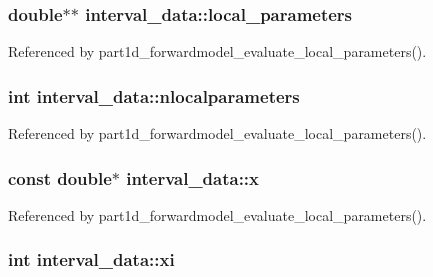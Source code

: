 \subsubsection[{\texorpdfstring{local\+\_\+parameters}{local_parameters}}]{\setlength{\rightskip}{0pt plus 5cm}double$\ast$$\ast$ interval\+\_\+data\+::local\+\_\+parameters}\hypertarget{structinterval__data_a1e7fbf7de483bc5799d45216be77801f}{}\label{structinterval__data_a1e7fbf7de483bc5799d45216be77801f}


Referenced by part1d\+\_\+forwardmodel\+\_\+evaluate\+\_\+local\+\_\+parameters().

\subsubsection[{\texorpdfstring{nlocalparameters}{nlocalparameters}}]{\setlength{\rightskip}{0pt plus 5cm}int interval\+\_\+data\+::nlocalparameters}\hypertarget{structinterval__data_ade5ceec3ebe5333bf2ace691bb44af27}{}\label{structinterval__data_ade5ceec3ebe5333bf2ace691bb44af27}


Referenced by part1d\+\_\+forwardmodel\+\_\+evaluate\+\_\+local\+\_\+parameters().

\subsubsection[{\texorpdfstring{x}{x}}]{\setlength{\rightskip}{0pt plus 5cm}const double$\ast$ interval\+\_\+data\+::x}\hypertarget{structinterval__data_a8ebc5c37f275985fd6f17bb3988ebe4c}{}\label{structinterval__data_a8ebc5c37f275985fd6f17bb3988ebe4c}


Referenced by part1d\+\_\+forwardmodel\+\_\+evaluate\+\_\+local\+\_\+parameters().

\subsubsection[{\texorpdfstring{xi}{xi}}]{\setlength{\rightskip}{0pt plus 5cm}int interval\+\_\+data\+::xi}\hypertarget{structinterval__data_a749c3569a6232d755e66e59577b679e1}{}\label{structinterval__data_a749c3569a6232d755e66e59577b679e1}


